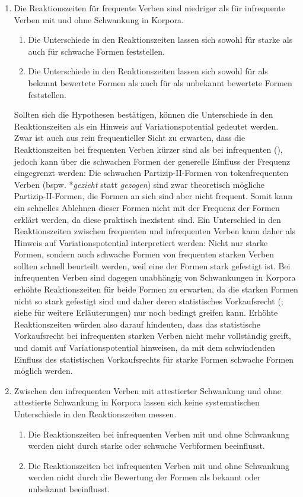\begin{enumerate} 
\item Die Reaktionszeiten für frequente Verben sind niedriger als für infrequente Verben mit und ohne Schwankung in Korpora.
\begin{enumerate}
\item Die Unterschiede in den Reaktionszeiten lassen sich sowohl für starke als auch für schwache Formen feststellen.
\item Die Unterschiede in den Reaktionszeiten lassen sich sowohl für als bekannt bewertete Formen als auch für als unbekannt bewertete Formen feststellen.
\end{enumerate}

Sollten sich die Hypothesen bestätigen, können die Unterschiede in den Reaktionszeiten als ein Hinweis auf Variationspotential gedeutet werden. Zwar ist auch aus rein frequentieller Sicht zu erwarten, dass die Reaktionszeiten bei frequenten Verben kürzer sind als bei infrequenten (\cite{Clahsen.2001}), jedoch kann über die schwachen Formen der generelle Einfluss der Frequenz eingegrenzt werden: Die schwachen Partizip-II-Formen von tokenfrequenten Verben (bspw. *\textit{gezieht} statt \textit{gezogen}) sind zwar theoretisch mögliche Partizip-II-Formen, die Formen an sich sind aber nicht frequent. Somit kann ein schnelles Ablehnen dieser Formen nicht mit der Frequenz der Formen erklärt werden, da diese praktisch inexistent sind. Ein Unterschied in den Reaktionszeiten zwischen frequenten und infrequenten Verben kann daher als Hinweis auf Variationspotential interpretiert werden: Nicht nur starke Formen, sondern auch schwache Formen von frequenten starken Verben sollten schnell beurteilt werden, weil eine der Formen stark gefestigt ist. Bei infrequenten Verben sind dagegen unabhängig von Schwankungen in Korpora erhöhte Reaktionszeiten für beide Formen zu erwarten, da die starken Formen nicht so stark gefestigt sind und daher deren statistisches Vorkaufsrecht (\cite[74--94]{Goldberg.2019}; siehe  für weitere Erläuterungen) nur noch bedingt greifen kann. Erhöhte Reaktionszeiten würden also darauf hindeuten, dass das statistische Vorkaufsrecht bei infrequenten starken Verben nicht mehr vollständig greift, und damit auf Variationspotential hinweisen, da mit dem schwindenden Einfluss des statistischen Vorkaufsrechts für starke Formen schwache Formen möglich werden.

\item Zwischen den infrequenten Verben mit attestierter Schwankung und ohne attestierte Schwankung in Korpora lassen sich keine systematischen Unterschiede in den Reaktionszeiten messen.
\begin{enumerate}
\item Die Reaktionszeiten bei infrequenten Verben mit und ohne Schwankung werden nicht durch starke oder schwache Verbformen beeinflusst.
\item Die Reaktionszeiten bei infrequenten Verben mit und ohne Schwankung werden nicht durch die Bewertung der Formen als bekannt oder unbekannt beeinflusst.
\end{enumerate}\largerpage


\end{enumerate}
